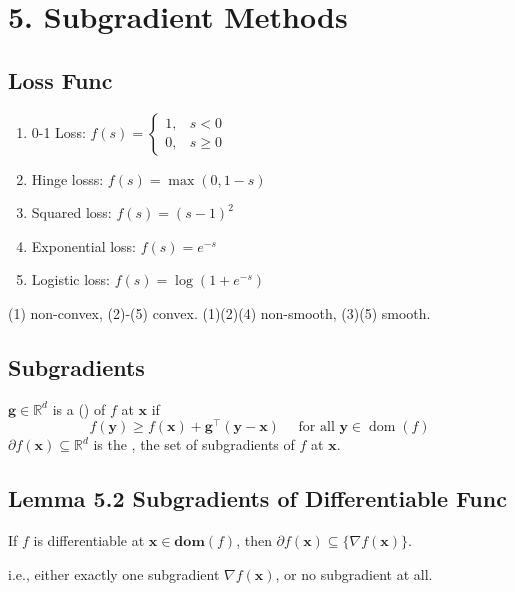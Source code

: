 \section*{5. Subgradient Methods}
\subsection*{Loss Func}
\begin{enumerate}[label = (\arabic*), leftmargin=*]
    \item 0-1 Loss: $f(s)= \begin{cases}1, & s<0 \\ 0, & s \geq 0\end{cases}$
    \item Hinge losss: $f(s)=\max (0,1-s)$
    \item Squared loss: $f(s)=(s-1)^{2}$
    \item Exponential loss: $f(s)=e^{-s}$
    \item Logistic loss: $f(s)=\log \left(1+e^{-s}\right)$
\end{enumerate}
(1) non-convex, (2)-(5) convex.
(1)(2)(4) non-smooth, (3)(5) smooth.



\subsection*{Subgradients}
$\mathbf{g} \in \mathbb{R}^{d}$ is a  () of $f$ at $\mathbf{x}$ if
$$
f(\mathbf{y}) \geq f(\mathbf{x})+\mathbf{g}^{\top}(\mathbf{y}-\mathbf{x}) \quad \text { for all } \mathbf{y} \in \operatorname{dom}(f)
$$
$\partial f(\mathbf{x}) \subseteq \mathbb{R}^{d}$ is the , the set of subgradients of $f$ at $\mathbf{x}$.




\subsection*{Lemma 5.2 Subgradients of Differentiable Func}
If $f$ is differentiable at $\mathbf{x} \in \mathbf{d o m}(f)$, then $\partial f(\mathbf{x}) \subseteq\{\nabla f(\mathbf{x})\}$.

i.e., either exactly one subgradient $\nabla f(\mathbf{x})$, or no subgradient at all.





